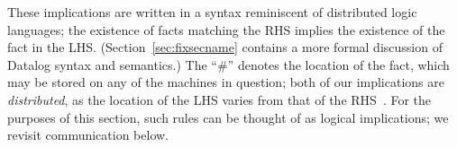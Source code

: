 These implications are written in a syntax reminiscent of distributed
logic languages; the existence of facts matching the RHS implies the
existence of the fact in the LHS.  (Section~\ref{sec:fixsecname}
contains a more formal discussion of Datalog syntax and semantics.)
The ``\#'' denotes the location of the fact, which may be stored on
any of the machines in question; both of our implications are {\em
  distributed}, as the location of the LHS varies from that of the
RHS~\cite{Loo2009-CACM}.  For the purposes of this section, such rules can be thought of
as logical implications; we revisit communication below.






